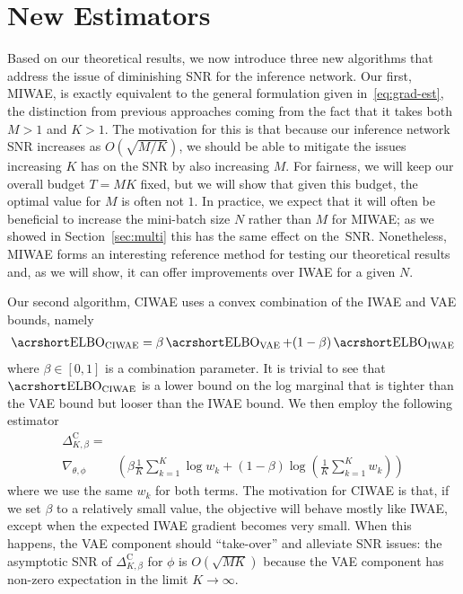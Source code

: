 
\section{New Estimators}
\label{sec:algs}

Based on our theoretical results, we now introduce three new
algorithms that address the issue of diminishing \gls{SNR} for the inference
network.  Our first, \gls{MIWAE}, is exactly equivalent to the 
general formulation given in~\eqref{eq:grad-est}, the distinction from previous
approaches coming from the fact that it takes both $M>1$ and $K>1$.  
The motivation for this is that because our inference network \gls{SNR} increases as
$O(\sqrt{M/K})$, we should be able to mitigate the issues increasing
$K$ has on the \gls{SNR} by also increasing $M$.  For fairness, we will
keep our overall budget $T=MK$ fixed, but we will show that given this
budget, the optimal value for $M$ is often not $1$.  In practice, we expect that
it will often be beneficial to increase the mini-batch size $N$ rather than $M$ for
\gls{MIWAE};
as we showed in Section~\ref{sec:multi} this has the same effect on the~\gls{SNR}.  Nonetheless, \gls{MIWAE} forms an interesting reference method
for testing our theoretical results and, as we will show, it can offer improvements
over \gls{IWAE} for a given $N$.

Our second algorithm, \gls{CIWAE} uses a convex combination of the
\gls{IWAE} and \gls{VAE} bounds, namely
\begin{align}
\ELBO_{\text{CIWAE}} = \beta \ELBO_{\text{VAE}} + (1-\beta) \ELBO_{\text{IWAE}}
\end{align}
where $\beta \in [0,1]$ is a combination parameter.  It is trivial
to see that $\ELBO_{\text{CIWAE}}$ is a lower bound on the log marginal
that is tighter than the \gls{VAE} bound but looser than the \gls{IWAE}
bound.  We then employ the following estimator
\begin{align}
\label{eq:CIWAE-est}
\Delta_{K,\beta}^{\text{C}}
=& \\\nabla_{\theta, \phi} &\left(
\beta \frac{1}{K} \sum_{k=1}^{K} 
\log w_k + (1-\beta) \log \left(\frac{1}{K} \sum_{k=1}^{K}  w_k\right)\right) \nonumber
\end{align}
where we use the same $w_k$ for both terms.  The motivation
for  \gls{CIWAE} is that, if we set $\beta$ to a relatively small value, the
objective will behave mostly like \gls{IWAE}, except when the
expected \gls{IWAE} gradient becomes very small.  When this happens,
the \gls{VAE} component should ``take-over'' and alleviate SNR issues:
the asymptotic SNR of $\Delta_{K,\beta}^{\text{C}}$ for $\phi$ is
$O(\sqrt{MK})$ because the \gls{VAE} component has non-zero expectation
in the limit $K\rightarrow\infty$.

